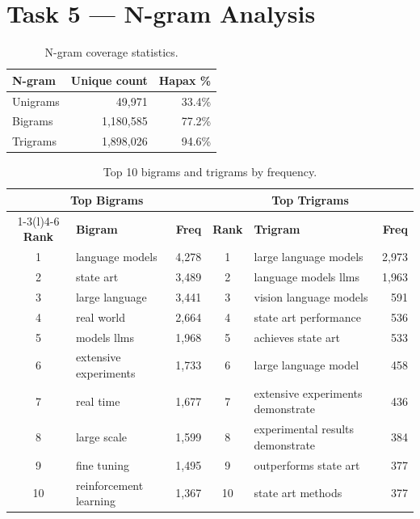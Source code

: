 \documentclass[10pt,a4paper]{article}
\begin{document}
\section{Task 5 --- N-gram Analysis}

\begin{table}[H]
\centering
\caption{N-gram coverage statistics.}
\begin{tabular}{lrr}
\toprule
\textbf{N-gram} & \textbf{Unique count} & \textbf{Hapax \%} \\
\midrule
Unigrams &     49{,}971 & 33.4\% \\
Bigrams  & 1{,}180{,}585 & 77.2\% \\
Trigrams & 1{,}898{,}026 & 94.6\% \\
\bottomrule
\end{tabular}
\end{table}

\begin{table}[H]
\centering
\caption{Top 10 bigrams and trigrams by frequency.}
\begin{tabular}{clrclr}
\toprule
\multicolumn{3}{c}{\textbf{Top Bigrams}} & \multicolumn{3}{c}{\textbf{Top Trigrams}} \\
\cmidrule(r){1-3}\cmidrule(l){4-6}
\textbf{Rank} & \textbf{Bigram} & \textbf{Freq} &
\textbf{Rank} & \textbf{Trigram} & \textbf{Freq} \\
\midrule
1  & language models        & 4{,}278 & 1  & large language models    & 2{,}973 \\
2  & state art              & 3{,}489 & 2  & language models llms     & 1{,}963 \\
3  & large language         & 3{,}441 & 3  & vision language models   &   591 \\
4  & real world             & 2{,}664 & 4  & state art performance    &   536 \\
5  & models llms            & 1{,}968 & 5  & achieves state art       &   533 \\
6  & extensive experiments  & 1{,}733 & 6  & large language model     &   458 \\
7  & real time              & 1{,}677 & 7  & extensive experiments demonstrate & 436 \\
8  & large scale            & 1{,}599 & 8  & experimental results demonstrate  & 384 \\
9  & fine tuning            & 1{,}495 & 9  & outperforms state art    &   377 \\
10 & reinforcement learning & 1{,}367 & 10 & state art methods        &   377 \\
\bottomrule
\end{tabular}
\end{table}
\end{document}
